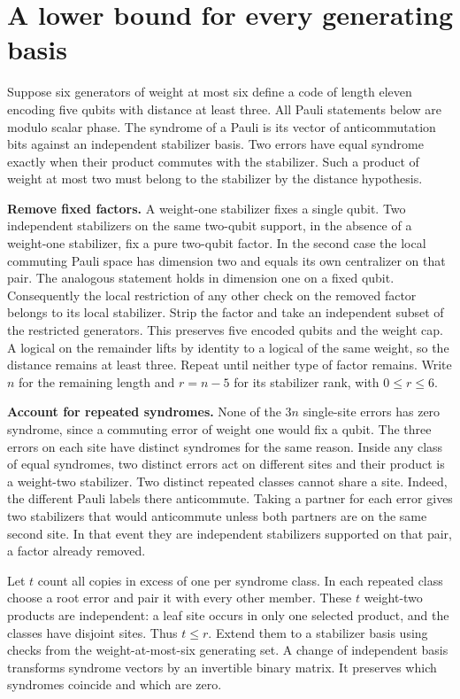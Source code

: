 \documentclass[11pt]{article}
\begin{document}
\section*{A lower bound for every generating basis}
Suppose six generators of weight at most six define a code of length eleven encoding five qubits with distance at least three. All Pauli statements below are modulo scalar phase. The syndrome of a Pauli is its vector of anticommutation bits against an independent stabilizer basis. Two errors have equal syndrome exactly when their product commutes with the stabilizer. Such a product of weight at most two must belong to the stabilizer by the distance hypothesis.

\textbf{Remove fixed factors.} A weight-one stabilizer fixes a single qubit. Two independent stabilizers on the same two-qubit support, in the absence of a weight-one stabilizer, fix a pure two-qubit factor. In the second case the local commuting Pauli space has dimension two and equals its own centralizer on that pair. The analogous statement holds in dimension one on a fixed qubit. Consequently the local restriction of any other check on the removed factor belongs to its local stabilizer. Strip the factor and take an independent subset of the restricted generators. This preserves five encoded qubits and the weight cap. A logical on the remainder lifts by identity to a logical of the same weight, so the distance remains at least three. Repeat until neither type of factor remains. Write $n$ for the remaining length and $r=n-5$ for its stabilizer rank, with $0\le r\le6$.

\textbf{Account for repeated syndromes.} None of the $3n$ single-site errors has zero syndrome, since a commuting error of weight one would fix a qubit. The three errors on each site have distinct syndromes for the same reason. Inside any class of equal syndromes, two distinct errors act on different sites and their product is a weight-two stabilizer. Two distinct repeated classes cannot share a site. Indeed, the different Pauli labels there anticommute. Taking a partner for each error gives two stabilizers that would anticommute unless both partners are on the same second site. In that event they are independent stabilizers supported on that pair, a factor already removed.

Let $t$ count all copies in excess of one per syndrome class. In each repeated class choose a root error and pair it with every other member. These $t$ weight-two products are independent: a leaf site occurs in only one selected product, and the classes have disjoint sites. Thus $t\le r$. Extend them to a stabilizer basis using checks from the weight-at-most-six generating set. A change of independent basis transforms syndrome vectors by an invertible binary matrix. It preserves which syndromes coincide and which are zero.
\end{document}
